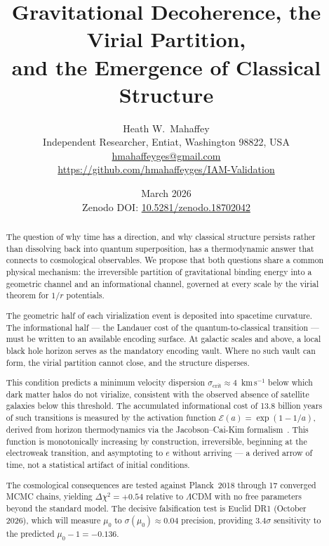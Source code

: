 \documentclass[12pt,a4paper]{article}
\title{\textbf{Gravitational Decoherence, the Virial Partition,\\
and the Emergence of Classical Structure}}
\author{Heath W.\ Mahaffey\\
\small Independent Researcher, Entiat, Washington 98822, USA\\
\small \href{mailto:hmahaffeyges@gmail.com}{hmahaffeyges@gmail.com}\\
\small \url{https://github.com/hmahaffeyges/IAM-Validation}}
\date{March 2026\\
\small Zenodo DOI: \href{https://doi.org/10.5281/zenodo.18702042}{10.5281/zenodo.18702042}}
\begin{document}
\maketitle

\begin{abstract}
The question of why time has a direction, and why classical structure
persists rather than dissolving back into quantum superposition, has a
thermodynamic answer that connects to cosmological observables. We propose
that both questions share a common physical mechanism: the irreversible
partition of gravitational binding energy into a geometric channel and an
informational channel, governed at every scale by the virial theorem for
$1/r$ potentials.

The geometric half of each virialization event is deposited into spacetime
curvature. The informational half --- the Landauer cost of the
quantum-to-classical transition --- must be written to an available encoding
surface. At galactic scales and above, a local black hole horizon serves as
the mandatory encoding vault. Where no such vault can form, the virial
partition cannot close, and the structure disperses.

This condition predicts a minimum velocity dispersion $\sigma_\mathrm{crit}
\approx 4$~km\,s$^{-1}$ below which dark matter halos do not virialize,
consistent with the observed absence of satellite galaxies below this
threshold. The accumulated informational cost of 13.8 billion years of
such transitions is measured by the activation function $\mathcal{E}(a) =
\exp(1 - 1/a)$, derived from horizon thermodynamics via the
Jacobson--Cai-Kim formalism~\citep{Jacobson1995,CaiKim2005}. This function
is monotonically increasing by construction, irreversible, beginning at
the electroweak transition, and asymptoting to $e$ without arriving ---
a derived arrow of time, not a statistical artifact of initial conditions.

The cosmological consequences are tested against Planck~2018 through 17
converged MCMC chains, yielding $\Delta\chi^2 = +0.54$ relative to
$\Lambda$CDM with no free parameters beyond the standard model. The
decisive falsification test is Euclid DR1 (October 2026), which will
measure $\mu_0$ to $\sigma(\mu_0) \approx 0.04$ precision, providing
$3.4\sigma$ sensitivity to the predicted $\mu_0 - 1 = -0.136$.
\end{abstract}

\end{document}

